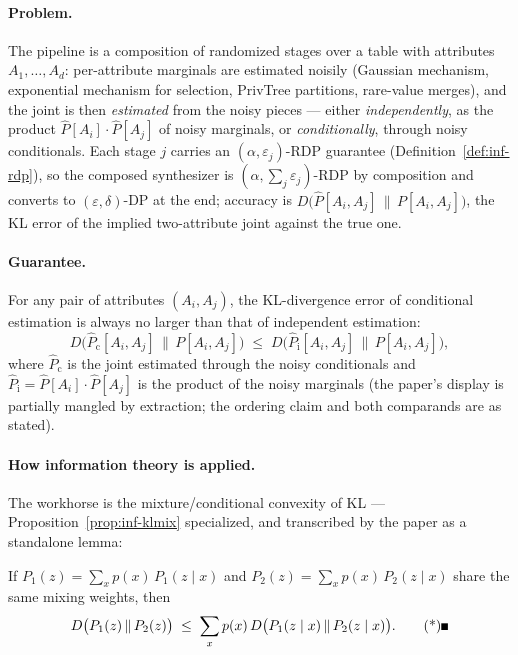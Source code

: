 \paragraph{Problem.}
The pipeline is a composition of randomized stages over a table with attributes
$A_1, \dots, A_d$: per-attribute marginals are estimated noisily (Gaussian mechanism,
exponential mechanism for selection, PrivTree partitions, rare-value merges), and the
joint is then \emph{estimated} from the noisy pieces --- either \emph{independently},
as the product $\hat P[A_i]\cdot\hat P[A_j]$ of noisy marginals, or
\emph{conditionally}, through noisy conditionals. Each stage $j$ carries an
$(\alpha, \varepsilon_j)$-RDP guarantee (Definition~\ref{def:inf-rdp}), so the
composed synthesizer is $(\alpha, \sum_j \varepsilon_j)$-RDP by composition and
converts to $(\varepsilon, \delta)$-DP at the end; accuracy is
$D\bigl(\hat P[A_i, A_j] \,\|\, P[A_i, A_j]\bigr)$, the KL error of the implied
two-attribute joint against the true one.

\paragraph{Guarantee.}

\begin{theorem}
\label{thm:inf-dpsynth-order}
For any pair of attributes $(A_i, A_j)$, the KL-divergence error of conditional
estimation is always no larger than that of independent estimation:
\[
D\bigl(\hat P_{\mathrm{c}}[A_i, A_j] \,\big\|\, P[A_i, A_j]\bigr)
\;\le\;
D\bigl(\hat P_{\mathrm{i}}[A_i, A_j] \,\big\|\, P[A_i, A_j]\bigr),
\]
where $\hat P_{\mathrm{c}}$ is the joint estimated through the noisy conditionals and
$\hat P_{\mathrm{i}} = \hat P[A_i]\cdot \hat P[A_j]$ is the product of the noisy
marginals (the paper's display is partially mangled by extraction; the ordering claim
and both comparands are as stated). \eop
\end{theorem}

\paragraph{How information theory is applied.}
The workhorse is the mixture/conditional convexity of KL --- Proposition~\ref{prop:inf-klmix}
specialized, and transcribed by the paper as a standalone lemma:

\begin{lemma}\label{lem:inf-dpsynth-convex}
If $P_1(z) = \sum_x p(x)\,P_1(z \mid x)$ and $P_2(z) = \sum_x p(x)\,P_2(z \mid x)$ share
the same mixing weights, then
\[
D\bigl(P_1(z) \,\|\, P_2(z)\bigr)
\;\le\; \sum_x p(x)\, D\bigl(P_1(z \mid x) \,\|\, P_2(z \mid x)\bigr). \eopm
\]
\end{lemma}

